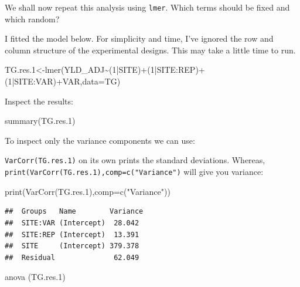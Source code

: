 \documentclass[
]{book}
\newenvironment{Shaded}{\begin{snugshade}}{\end{snugshade}}
\newcommand{\AttributeTok}[1]{\textcolor[rgb]{0.77,0.63,0.00}{#1}}
\newcommand{\DecValTok}[1]{\textcolor[rgb]{0.00,0.00,0.81}{#1}}
\newcommand{\FloatTok}[1]{\textcolor[rgb]{0.00,0.00,0.81}{#1}}
\newcommand{\FunctionTok}[1]{\textcolor[rgb]{0.00,0.00,0.00}{#1}}
\newcommand{\NormalTok}[1]{#1}
\newcommand{\OtherTok}[1]{\textcolor[rgb]{0.56,0.35,0.01}{#1}}
\newcommand{\SpecialCharTok}[1]{\textcolor[rgb]{0.00,0.00,0.00}{#1}}
\newcommand{\StringTok}[1]{\textcolor[rgb]{0.31,0.60,0.02}{#1}}
\begin{document}
We shall now repeat this analysis using \texttt{lmer}. Which terms should be fixed and which random?

I fitted the model below. For simplicity and time, I've ignored the row and column structure of the experimental designs. This may take a little time to run.

\begin{Shaded}
\begin{Highlighting}[]
\NormalTok{TG.res}\FloatTok{.1}\OtherTok{\textless{}{-}}\FunctionTok{lmer}\NormalTok{(YLD\_ADJ}\SpecialCharTok{\textasciitilde{}}\NormalTok{(}\DecValTok{1}\SpecialCharTok{|}\NormalTok{SITE)}\SpecialCharTok{+}\NormalTok{(}\DecValTok{1}\SpecialCharTok{|}\NormalTok{SITE}\SpecialCharTok{:}\NormalTok{REP)}\SpecialCharTok{+}\NormalTok{(}\DecValTok{1}\SpecialCharTok{|}\NormalTok{SITE}\SpecialCharTok{:}\NormalTok{VAR)}\SpecialCharTok{+}\NormalTok{VAR,}\AttributeTok{data=}\NormalTok{TG)}
\end{Highlighting}
\end{Shaded}

Inspect the results:

\begin{Shaded}
\begin{Highlighting}[]
\FunctionTok{summary}\NormalTok{(TG.res}\FloatTok{.1}\NormalTok{)}
\end{Highlighting}
\end{Shaded}

To inspect only the variance components we can use:

\texttt{VarCorr(TG.res.1)} on its own prints the standard deviations. Whereas, \texttt{print(VarCorr(TG.res.1),comp=c("Variance")} will give you variance:

\begin{Shaded}
\begin{Highlighting}[]
\FunctionTok{print}\NormalTok{(}\FunctionTok{VarCorr}\NormalTok{(TG.res}\FloatTok{.1}\NormalTok{),}\AttributeTok{comp=}\FunctionTok{c}\NormalTok{(}\StringTok{"Variance"}\NormalTok{))}
\end{Highlighting}
\end{Shaded}

\begin{verbatim}
##  Groups   Name        Variance
##  SITE:VAR (Intercept)  28.042 
##  SITE:REP (Intercept)  13.391 
##  SITE     (Intercept) 379.378 
##  Residual              62.049
\end{verbatim}

\begin{Shaded}
\begin{Highlighting}[]
\FunctionTok{anova}\NormalTok{ (TG.res}\FloatTok{.1}\NormalTok{)}
\end{Highlighting}
\end{Shaded}
\end{document}

